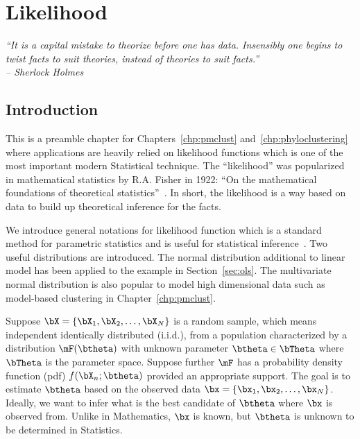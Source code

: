 
\chapter{Likelihood}
\label{chp:likelihood}


{\it
``It is a capital mistake to theorize before one has data.
Insensibly one begins to twist facts to suit theories,
instead of theories to suit facts.'' \\
\--- Sherlock Holmes
}


\section{Introduction}
\label{sec:likelihood_introduction}

This is a preamble chapter for Chapters~\ref{chp:pmclust}
and~\ref{chp:phyloclustering} where applications are heavily relied on
likelihood functions which is one of the most
important modern Statistical technique.
The ``likelihood'' was popularized
in mathematical statistics by R.A. Fisher in 1922:
``On the mathematical foundations of theoretical
statistics''~\citep{Fisher1922}.
In short, the likelihood is a way based on data to build up
theoretical inference for the facts.

We introduce general notations for likelihood function
which is a standard method for parametric statistics and is
useful for statistical inference~\citep{Casella2001}.
Two useful distributions are introduced.
The normal distribution additional to linear model has been applied to
the example in Section~\ref{sec:ols}.
The multivariate normal
distribution
is also popular to model high dimensional data such as
model-based clustering in Chapter~\ref{chp:pmclust}.

Suppose $\bX = \{\bX_1, \bX_2, \ldots, \bX_N\}$ is a random sample,
which means independent identically distributed
(i.i.d.),
from a population characterized by a distribution $\mF(\btheta)$ with unknown
parameter $\btheta \in \bTheta$ where $\bTheta$ is the parameter space.
Suppose further $\mF$ has a probability density function
(pdf)
$f(\bX_n; \btheta)$ provided an appropriate support.
The goal is to estimate $\btheta$ based on the observed data
$\bx = \{\bx_1, \bx_2, \ldots, \bx_N\}$.
Ideally, we want to infer what is the best candidate of $\btheta$
where $\bx$ is observed from.
Unlike in Mathematics, $\bx$ is known, but $\btheta$ is unknown
to be determined in Statistics.

